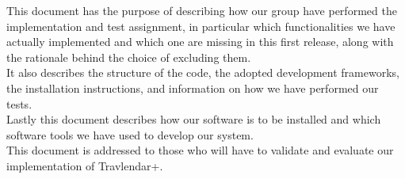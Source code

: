 This document has the purpose of describing how our group have performed the implementation and test assignment, in particular which functionalities we have actually implemented and which one are missing in this first release, along with the rationale behind the choice of excluding them. \\ It also describes the structure of the code, the adopted development frameworks, the installation instructions, and information on how we have performed our tests. \\ Lastly this document describes how our software is to be installed and which software tools we have used to develop our system.\\
This document is addressed to those who will have to validate and evaluate our implementation of Travlendar+.